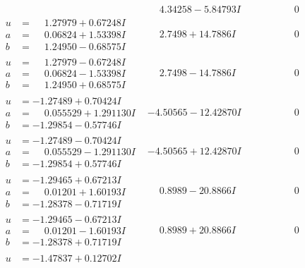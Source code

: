 \documentclass[1p]{elsarticle_modified}
\theoremstyle{definition}
\begin{document}
$$\begin{array}{c|c|c}
 & \phantom{-}4.34258 - 5.84793 I & \phantom{-0.000000 } 0 \\ \hline\begin{aligned}
u &= \phantom{-}1.27979 + 0.67248 I \\
a &= \phantom{-}0.06824 + 1.53398 I \\
b &= \phantom{-}1.24950 - 0.68575 I\end{aligned}
 & \phantom{-}2.7498 + 14.7886 I & \phantom{-0.000000 } 0 \\ \hline\begin{aligned}
u &= \phantom{-}1.27979 - 0.67248 I \\
a &= \phantom{-}0.06824 - 1.53398 I \\
b &= \phantom{-}1.24950 + 0.68575 I\end{aligned}
 & \phantom{-}2.7498 - 14.7886 I & \phantom{-0.000000 } 0 \\ \hline\begin{aligned}
u &= -1.27489 + 0.70424 I \\
a &= \phantom{-}0.055529 + 1.291130 I \\
b &= -1.29854 - 0.57746 I\end{aligned}
 & -4.50565 - 12.42870 I & \phantom{-0.000000 } 0 \\ \hline\begin{aligned}
u &= -1.27489 - 0.70424 I \\
a &= \phantom{-}0.055529 - 1.291130 I \\
b &= -1.29854 + 0.57746 I\end{aligned}
 & -4.50565 + 12.42870 I & \phantom{-0.000000 } 0 \\ \hline\begin{aligned}
u &= -1.29465 + 0.67213 I \\
a &= \phantom{-}0.01201 + 1.60193 I \\
b &= -1.28378 - 0.71719 I\end{aligned}
 & \phantom{-}0.8989 - 20.8866 I & \phantom{-0.000000 } 0 \\ \hline\begin{aligned}
u &= -1.29465 - 0.67213 I \\
a &= \phantom{-}0.01201 - 1.60193 I \\
b &= -1.28378 + 0.71719 I\end{aligned}
 & \phantom{-}0.8989 + 20.8866 I & \phantom{-0.000000 } 0 \\ \hline\begin{aligned}
u &= -1.47837 + 0.12702 I \\

\end{aligned}
\end{array}$$
\end{document}
